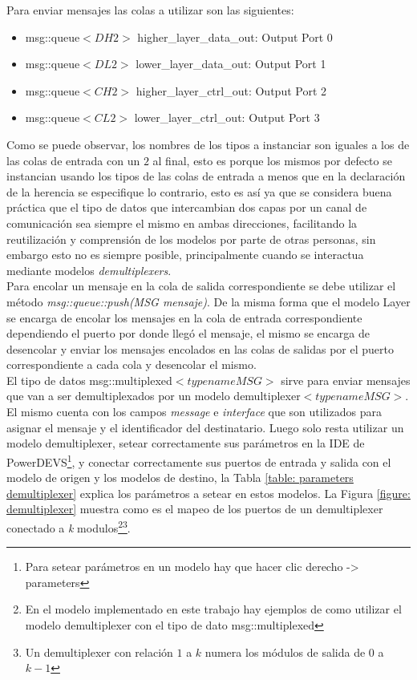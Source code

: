 \documentclass[10pt,a4paper]{article}
\begin{document}
Para enviar mensajes las colas a utilizar son las siguientes:
\begin{itemize}
\item msg::queue$<DH2>$ higher\_layer\_data\_out: Output Port 0 
\item msg::queue$<DL2>$ lower\_layer\_data\_out:  Output Port 1
\item msg::queue$<CH2>$ higher\_layer\_ctrl\_out: Output Port 2
\item msg::queue$<CL2>$ lower\_layer\_ctrl\_out:  Output Port 3
\end{itemize}

Como se puede observar, los nombres de los tipos a instanciar son iguales a los de las colas de entrada con un $2$ al final, esto es porque los mismos por defecto se instancian usando los tipos de las colas de entrada a menos que en la declaración de la herencia se especifique lo contrario, esto es así ya que se considera buena práctica que el tipo de datos que intercambian dos capas por un canal de comunicación sea siempre el mismo en ambas direcciones, facilitando la reutilización y comprensión de los modelos por parte de otras personas, sin embargo esto no es siempre posible, principalmente cuando se interactua mediante modelos \textit{demultiplexers}. \\

Para encolar un mensaje en la cola de salida correspondiente se debe utilizar el método \textit{msg::queue::push(MSG mensaje)}. De la misma forma que el modelo Layer se encarga de encolar los mensajes en la cola de entrada correspondiente dependiendo el puerto por donde llegó el mensaje, el mismo se encarga de desencolar y enviar los mensajes encolados en las colas de salidas por el puerto correspondiente a cada cola y desencolar el mismo. \\

El tipo de datos msg::multiplexed$<typename MSG>$ sirve para enviar mensajes que van a ser demultiplexados por un modelo demultiplexer$<typename MSG>$. El mismo cuenta con los campos \textit{message} e \textit{interface} que son utilizados para asignar el mensaje y el identificador del destinatario. Luego solo resta utilizar un modelo demultiplexer, setear correctamente sus parámetros en la IDE de PowerDEVS\footnote{Para setear parámetros en un modelo hay que hacer clic derecho -> parameters}, y conectar correctamente sus puertos de entrada y salida con el modelo de origen y los modelos de destino, la Tabla \ref{table: parameters demultiplexer} explica los parámetros a setear en estos modelos. La Figura \ref{figure: demultiplexer} muestra como es el mapeo de los puertos de un demultiplexer conectado a \textit{k} modulos\footnote{En el modelo implementado en este trabajo hay ejemplos de como utilizar el modelo demultiplexer con el tipo de dato msg::multiplexed}\footnote{Un demultiplexer con relación $1$ a $k$ numera los módulos de salida de $0$ a $k-1$}. \\
\end{document}
